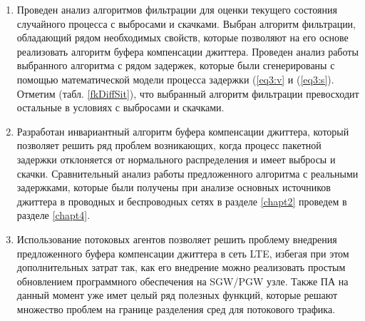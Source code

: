 \begin{enumerate}
 \item Проведен анализ алгоритмов фильтрации для оценки текущего состояния случайного процесса с выбросами и скачками. Выбран алгоритм фильтрации, обладающий рядом необходимых свойств, которые позволяют на его основе реализовать алгоритм буфера компенсации джиттера. Проведен анализ работы выбранного алгоритма с рядом задержек, которые были сгенерированы с помощью математической модели процесса задержки (\ref{eq3:v} и (\ref{eq3:s}). Отметим (табл. \ref{fkDiffSit}), что выбранный алгоритм фильтрации превосходит остальные в условиях с выбросами и скачками.
 \item Разработан инвариантный алгоритм буфера компенсации джиттера, который позволяет решить ряд проблем возникающих, когда процесс пакетной задержки отклоняется от нормального распределения и имеет выбросы и скачки. Сравнительный анализ работы предложенного алгоритма с реальными задержками, которые были получены при анализе основных источников джиттера в проводных и беспроводных сетях в разделе \ref{chapt2} проведем в разделе \ref{chapt4}.
 \item Использование потоковых агентов позволяет решить проблему внедрения предложенного буфера компенсации джиттера в сеть LTE, избегая при этом дополнительных затрат так, как его внедрение можно реализовать простым обновлением программного обеспечения на SGW/PGW узле. Также ПА на данный момент уже имет целый ряд полезных функций, которые решают множество проблем на границе разделения сред для потокового трафика.
 \end{enumerate}



